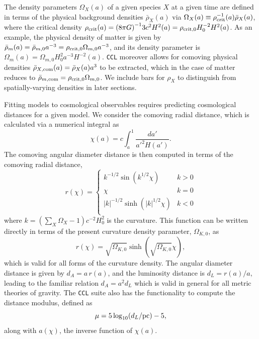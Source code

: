 \documentclass[\docopts]{\docclass}
\newcommand{\ccl}{{\tt CCL}\xspace}
\begin{document}
The density parameters $\Omega_X(a)$ of a given species $X$ at a given time are defined in terms of the physical background densities $\bar\rho_X(a)$ via $\Omega_X(a) \equiv \rho^{-1}_{\rm crit}(a) \bar\rho_X(a)$, where the critical density $\rho_{\rm crit}(a) = {( 8 \pi G)}^{-1} 3c^2H^2(a) = \rho_{\rm crit,0} H_0^{-2} H^2(a)$. As an example, the physical density of matter is given by $\bar\rho_m(a) = \bar\rho_{m,0} a^{-3} = \rho_{\rm crit,0} \Omega_{m,0} a^{-3}$, and its density parameter is $\Omega_m(a) = \Omega_{m,0} H_0^{2} a^{-3} H^{-2}(a)$. \ccl moreover allows for comoving physical densities $\bar\rho_{X, {\rm com}}(a) = \bar\rho_X(a) a^3$ to be extracted, which in the case of matter reduces to $\bar\rho_{m, {\rm com}} = \rho_{\rm crit,0} \Omega_{m,0}$. We include bars for $\rho_X$ to distinguish from spatially-varying densities in later sections.

Fitting models to cosmological observables requires predicting cosmological distances for a given model. We consider the comoving radial distance, which is calculated via a numerical integral as
\begin{equation}
 \chi(a)= c \int_a^1 \frac{da'}{a'^2 H(a')}.
 \label{eq:comrdist}
\end{equation}
The comoving angular diameter distance is then computed in terms of the comoving radial distance,
\begin{equation}\label{eq:angdist}
 r(\chi)=\left\{\begin{array}{cc}
                 k^{-1/2}\sin(k^{1/2}\chi) & k>0\\
                 \chi & k=0\\
                 |k|^{-1/2}\sinh(|k|^{1/2}\chi) & k<0\\
                \end{array}\right.
\end{equation}
where $k = \left({\sum_X \Omega_X -1}\right) c^{-2} H_0^2$ is the curvature.
This function can be written directly in terms of the present curvature density parameter, $\Omega_{K,0}$, as
\begin{equation}\label{eq:angdist_omegak}
 r(\chi) = \sqrt{\Omega_{K,0}}\sinh(\sqrt{\Omega_{K,0}}\chi),
\end{equation}
which is valid for all forms of the curvature density.
The angular diameter distance is given by $d_A=a\,r(a)$, and the luminosity distance is
$d_L=r(a)/a,$ leading to the familiar relation $d_A = a^2d_L$ which is valid in general for all metric theories of gravity.
The \ccl suite also has the functionality to compute the distance modulus, defined as
\begin{equation}\label{eq:distmod}
    \mu = 5 \log_{10}(d_L / {\rm pc})-5,
\end{equation}
along with $a(\chi)$, the inverse function of $\chi(a)$.
\end{document}
